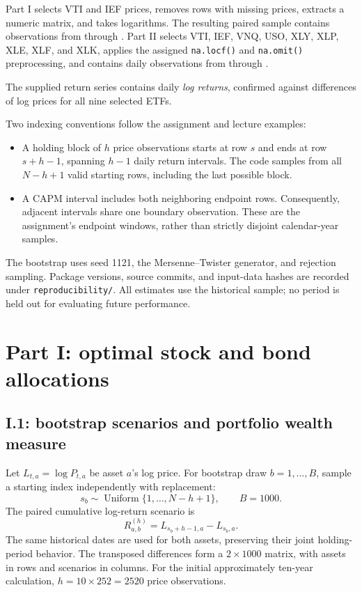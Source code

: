 \documentclass[11pt,letterpaper]{article}
\begin{document}
Part I selects VTI and IEF prices, removes rows with missing prices, extracts
a numeric matrix, and takes logarithms. The resulting
paired sample contains \HWPriceRows{} observations from
\texttt{\HWPriceStart} through \texttt{\HWPriceEnd}. Part II selects VTI, IEF,
VNQ, USO, XLY, XLP, XLE, XLF, and XLK, applies the assigned
\texttt{na.locf()} and \texttt{na.omit()} preprocessing, and contains
\HWReturnRows{} daily observations from \texttt{\HWReturnStart} through
\texttt{\HWReturnEnd}.

The supplied return series contains daily \emph{log returns}, confirmed
against differences of log prices for all nine selected ETFs.

Two indexing conventions follow the assignment and lecture examples:
\begin{itemize}
\item A holding block of $h$ price observations starts at row $s$ and ends at
row $s+h-1$, spanning $h-1$ daily return intervals. The code samples from all
$N-h+1$ valid starting rows, including the last possible block.
\item A CAPM interval includes both neighboring endpoint rows. Consequently,
adjacent intervals share one boundary observation. These are the assignment's
endpoint windows, rather than strictly disjoint calendar-year samples.
\end{itemize}

The bootstrap uses seed 1121, the Mersenne--Twister generator, and rejection
sampling. Package versions, source commits, and input-data hashes are
recorded under \texttt{reproducibility/}. All estimates use the historical
sample; no period is held out for evaluating future performance.

\section{Part I: optimal stock and bond allocations}
\subsection{I.1: bootstrap scenarios and portfolio wealth measure}
Let $L_{t,a}=\log P_{t,a}$ be asset $a$'s log price. For bootstrap draw
$b=1,\ldots,B$, sample a starting index independently with replacement:
\begin{equation}
s_b\sim\operatorname{Uniform}\{1,\ldots,N-h+1\},\qquad B=1000.
\end{equation}
The paired cumulative log-return scenario is
\begin{equation}
R_{a,b}^{(h)}=L_{s_b+h-1,a}-L_{s_b,a}.
\label{eq:bootstrap}
\end{equation}
The same historical dates are used for both assets, preserving their joint
holding-period behavior. The transposed differences form a $2\times1000$
matrix, with assets in rows and scenarios in columns. For the initial
approximately ten-year calculation, $h=10\times252=2520$ price observations.
\end{document}
